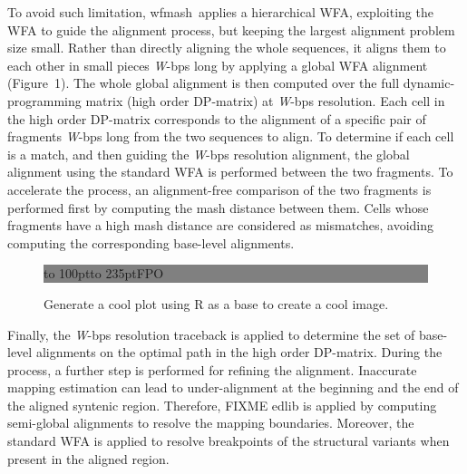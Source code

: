 \documentclass{bioinfo}
\newcommand{\wfmash}{wfmash}
\begin{document}
    To avoid such limitation, \wfmash\ applies a hierarchical WFA, exploiting the WFA to guide the alignment
    process, but keeping the largest alignment problem size small. Rather than directly aligning the whole
    sequences, it aligns them to each other in small pieces \textit{W}-bps long by applying a global WFA alignment
    (Figure~1\vphantom{\ref{fig:1}}). The whole global alignment is then computed over the full
    dynamic-programming matrix (high order DP-matrix) at \textit{W}-bps resolution.
    Each cell in the high order DP-matrix corresponds to the alignment of a specific pair of fragments
    \textit{W}-bps long from the two sequences to align. To determine if each cell is a match, and then guiding the
    \textit{W}-bps resolution alignment, the global alignment using the standard WFA is performed between the
    two fragments. To accelerate the process, an alignment-free comparison of the two fragments is performed first by
    computing the mash distance between them. Cells whose fragments have a high mash distance are considered as mismatches,
    avoiding computing the corresponding base-level alignments.

    \begin{figure}[!tpb]%
        \fboxsep=0pt\colorbox{gray}{
            \begin{minipage}[t]{235pt}
                \vbox to 100pt{\vfill\hbox to
                235pt{\hfill\fontsize{24pt}{24pt}\selectfont FPO\hfill}\vfill}
            \end{minipage}}
        \caption{Generate a cool plot using R as a base to create a cool image.}\label{fig:1}
    \end{figure}


    Finally, the \textit{W}-bps resolution traceback is applied to determine the set of base-level alignments
    on the optimal path in the high order DP-matrix. During the process, a further step is performed for
    refining the alignment. Inaccurate mapping estimation can lead to under-alignment at the beginning
    and the end of the aligned syntenic region. Therefore, FIXME edlib is applied by computing semi-global alignments
    to resolve the mapping boundaries. Moreover, the standard WFA is applied to resolve breakpoints of the structural
    variants when present in the aligned region.
\end{document}

